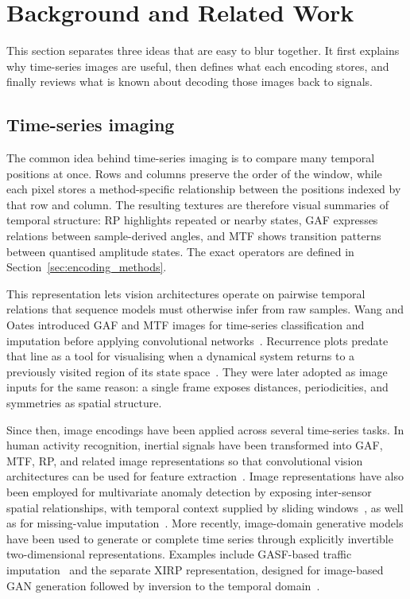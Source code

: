 \documentclass[5p]{elsarticle}
\begin{document}
\section{Background and Related Work}\label{sec:related_encodings}

This section separates three ideas that are easy to blur together. It first explains why time-series images are useful, then defines what each encoding stores, and finally reviews what is known about decoding those images back to signals.

\subsection{Time-series imaging}
The common idea behind time-series imaging is to compare many temporal positions at once. Rows and columns preserve the order of the window, while each pixel stores a method-specific relationship between the positions indexed by that row and column. The resulting textures are therefore visual summaries of temporal structure: RP highlights repeated or nearby states, GAF expresses relations between sample-derived angles, and MTF shows transition patterns between quantised amplitude states. The exact operators are defined in Section~\ref{sec:encoding_methods}.

This representation lets vision architectures operate on pairwise temporal relations that sequence models must otherwise infer from raw samples. Wang and Oates introduced GAF and MTF images for time-series classification and imputation before applying convolutional networks~\cite{wang2015encoding,wang2015encoding2}. Recurrence plots predate that line as a tool for visualising when a dynamical system returns to a previously visited region of its state space~\cite{eckmann1987recurrence,marwan2007recurrence}. They were later adopted as image inputs for the same reason: a single frame exposes distances, periodicities, and symmetries as spatial structure.

Since then, image encodings have been applied across several time-series tasks. In human activity recognition, inertial signals have been transformed into GAF, MTF, RP, and related image representations so that convolutional vision architectures can be used for feature extraction~\cite{ahmad2021inertial}. Image representations have also been employed for multivariate anomaly detection by exposing inter-sensor spatial relationships, with temporal context supplied by sliding windows~\cite{ma2024anomaly}, as well as for missing-value imputation~\cite{huamin2020reconstruction}. More recently, image-domain generative models have been used to generate or complete time series through explicitly invertible two-dimensional representations. Examples include GASF-based traffic imputation~\cite{huang2023tsdigan} and the separate XIRP representation, designed for image-based GAN generation followed by inversion to the temporal domain~\cite{hellermann2026imagegan}.
\end{document}
